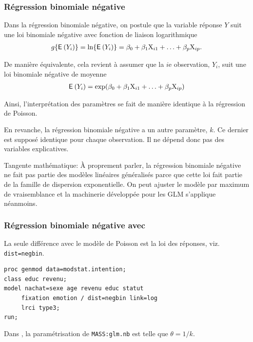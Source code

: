 \documentclass{beamer}
\begin{document}
\begin{frame}[fragile]
\frametitle{Régression binomiale négative}
\bi
\item Dans la régression binomiale négative, on postule que la variable réponse $Y$ 
suit une loi \alert{binomiale négative} avec \alert{fonction de liaison} logarithmique
\begin{align*}
g\{{\mathsf E}_{}\left(Y_i\right)\}=\ln\{{\mathsf E}_{}\left(Y_i\right)\}=\beta_0+\beta_1\mathrm{X}_{i1}+\ldots+\beta_p\mathrm{X}_{ip}.
\end{align*}
\item De manière équivalente, cela revient à assumer que la $i$e observation, $Y_i$, suit une loi binomiale négative de moyenne
\begin{align*}
{\mathsf E}_{}\left(Y_i\right)=\exp(\beta_0+\beta_1\mathrm{X}_{i1}+\ldots+\beta_p\mathrm{X}_{ip})
\end{align*}
\item Ainsi, l'interprétation des paramètres se fait de manière identique à la
régression de Poisson. 

\item En revanche, la régression binomiale négative a un autre paramètre, $k$. Ce dernier est supposé \alert{identique pour
chaque observation}. Il ne dépend donc pas des variables explicatives.
\ei

{ \tiny Tangente mathématique:
À proprement parler, la régression binomiale négative ne fait pas partie des modèles linéaires généralisés parce que cette loi fait partie de la famille de dispersion exponentielle. On peut ajuster le modèle par maximum de vraisemblance et la machinerie développée pour les GLM s'applique néanmoins.

}
\end{frame}



\begin{frame}[fragile]
\frametitle{Régression binomiale négative avec }
La seule différence avec le modèle de Poisson est la loi des réponses, viz. \texttt{dist=negbin}. 
\begin{tcolorbox}[colback=white, colframe=hecblue, title=Code SAS code pour ajuster une régression binomiale négative]
\begin{verbatim}
proc genmod data=modstat.intention;
class educ revenu;
model nachat=sexe age revenu educ statut
     fixation emotion / dist=negbin link=log
     lrci type3;
run;
\end{verbatim}
\end{tcolorbox}
{\footnotesize 
Dans \Rlang, la paramétrisation de \texttt{MASS:glm.nb} est telle que $\theta=1/k$.

}
\end{frame}
\end{document}
